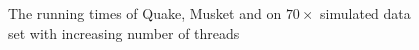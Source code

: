 \documentclass{bmcart}
\def\texttt{[image: ]}
\begin{document}
\begin{backmatter}
\begin{figure}[h!] %
\begin{center}
\caption{}
\end{center}
\end{figure}

\begin{figure}[h!] %
\begin{center}
\end{center}
\caption{ The running times of Quake, Musket and \tool on $70\times$ simulated data set with increasing number of threads}
\end{figure}



\end{backmatter}
\end{document}
